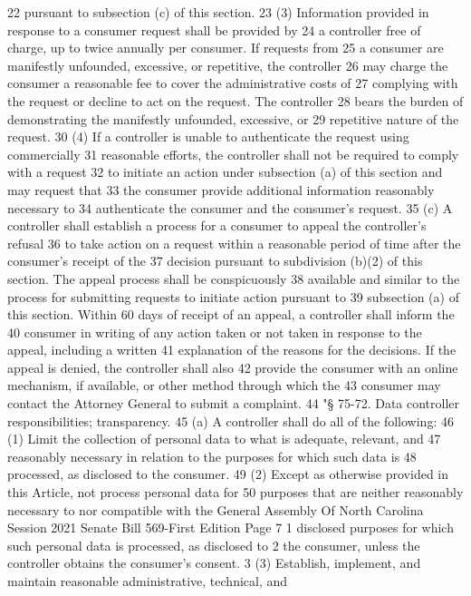 22 pursuant to subsection (c) of this section.
23 (3) Information provided in response to a consumer request shall be provided by
24 a controller free of charge, up to twice annually per consumer. If requests from
25 a consumer are manifestly unfounded, excessive, or repetitive, the controller
26 may charge the consumer a reasonable fee to cover the administrative costs of
27 complying with the request or decline to act on the request. The controller
28 bears the burden of demonstrating the manifestly unfounded, excessive, or
29 repetitive nature of the request.
30 (4) If a controller is unable to authenticate the request using commercially
31 reasonable efforts, the controller shall not be required to comply with a request
32 to initiate an action under subsection (a) of this section and may request that
33 the consumer provide additional information reasonably necessary to
34 authenticate the consumer and the consumer's request.
35 (c) A controller shall establish a process for a consumer to appeal the controller's refusal
36 to take action on a request within a reasonable period of time after the consumer's receipt of the
37 decision pursuant to subdivision (b)(2) of this section. The appeal process shall be conspicuously
38 available and similar to the process for submitting requests to initiate action pursuant to
39 subsection (a) of this section. Within 60 days of receipt of an appeal, a controller shall inform the
40 consumer in writing of any action taken or not taken in response to the appeal, including a written
41 explanation of the reasons for the decisions. If the appeal is denied, the controller shall also
42 provide the consumer with an online mechanism, if available, or other method through which the
43 consumer may contact the Attorney General to submit a complaint.
44 "§ 75-72. Data controller responsibilities; transparency.
45 (a) A controller shall do all of the following:
46 (1) Limit the collection of personal data to what is adequate, relevant, and
47 reasonably necessary in relation to the purposes for which such data is
48 processed, as disclosed to the consumer.
49 (2) Except as otherwise provided in this Article, not process personal data for
50 purposes that are neither reasonably necessary to nor compatible with the 
General Assembly Of North Carolina Session 2021
Senate Bill 569-First Edition Page 7
1 disclosed purposes for which such personal data is processed, as disclosed to
2 the consumer, unless the controller obtains the consumer's consent.
3 (3) Establish, implement, and maintain reasonable administrative, technical, and

